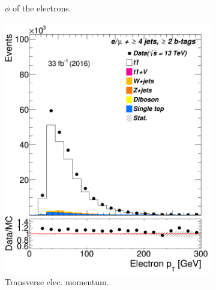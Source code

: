 \begin{figure}
\begin{subfigure}{0.25\textwidth}
		\caption{$\phi$ of the electrons.} \label{fig:d1}
	\end{subfigure}\hspace*{1.0cm}
\begin{subfigure}{0.25\textwidth}
	\includegraphics[width=\linewidth]{ControlPlots_emujets_2016_4incl_2incl/el_pt_emujets_2016.png}
	\caption{Transverse elec. momentum.} \label{fig:e31}
\end{subfigure}\hspace*{1.0cm}
\begin{subfigure}{0.25\textwidth}

\end{subfigure}
\end{figure}
